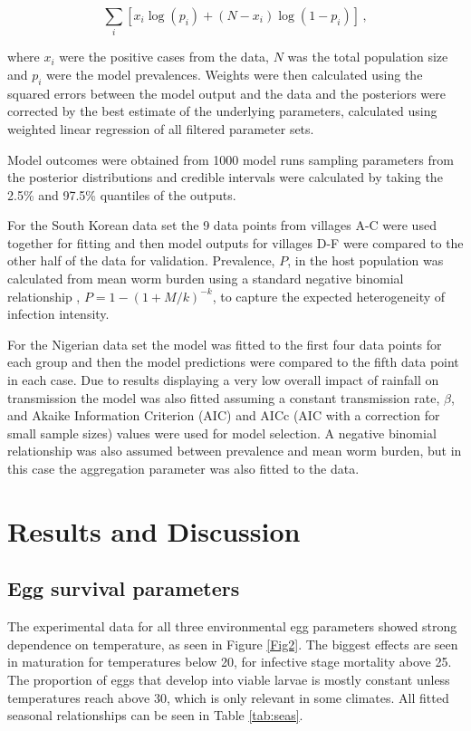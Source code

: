 \begin{equation}
\sum_{i}[x_i\log(p_i)+(N-x_i)\log(1-p_i)]\,, 
\end{equation}

where $x_i$ were the positive cases from the data, $N$ was the total population size and $p_i$ were the model prevalences. Weights were then calculated using the squared errors between the model output and the data and the posteriors were corrected by the best estimate of the underlying parameters, calculated using weighted linear regression of all filtered parameter sets.

Model outcomes were obtained from 1000 model runs sampling parameters from the posterior distributions and credible intervals were calculated by taking the 2.5\% and 97.5\% quantiles of the outputs.

For the South Korean data set the 9 data points from villages A-C were used together for fitting and then model outputs for villages D-F were compared to the other half of the data for validation. Prevalence, $P$, in the host population was calculated from mean worm burden using a standard negative binomial relationship \cite{Anderson1992}, $P = 1-(1+M/k)^{-k}$, to capture the expected heterogeneity of infection intensity.

For the Nigerian data set the model was fitted to the first four data points for each group and then the model predictions were compared to the fifth data point in each case. Due to results displaying a very low overall impact of rainfall on transmission the model was also fitted assuming a constant transmission rate, $\beta$, and Akaike Information Criterion (AIC) and AICc (AIC with a correction for small sample sizes) values were used for model selection. A negative binomial relationship was also assumed between prevalence and mean worm burden, but in this case the aggregation parameter was also fitted to the data.

\section{Results and Discussion}

\subsection{Egg survival parameters}

The experimental data for all three environmental egg parameters showed strong dependence on temperature, as seen in Figure \ref{Fig2}. The biggest effects are seen in maturation for temperatures below 20, for infective stage mortality above 25. The proportion of eggs that develop into viable larvae is mostly constant unless temperatures reach above 30, which is only relevant in some climates.  All fitted seasonal relationships can be seen in Table \ref{tab:seas}.

